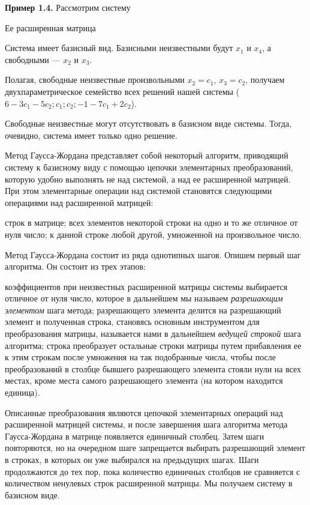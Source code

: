 \documentclass{article}
\begin{document}
\textbf{Пример 1.4.} Рассмотрим систему

Ее расширенная матрица

Система имеет базисный вид. Базисными неизвестными будут $x_1$ и $x_4$, а свободными — $x_2$ и $x_3$.

Полагая, свободные неизвестные произвольными $x_2=c_1$, $x_3=c_2$, получаем двухпараметрическое семейство всех решений нашей системы ($6-3c_1-5c_2;c_1;c_2;-1-7c_1+2c_2$).

Свободные неизвестные могут отсутствовать в базисном виде системы. Тогда, очевидно, система имеет только одно решение.

Метод Гаусса-Жордана представляет собой некоторый алгоритм, приводящий систему к базисному виду с помощью цепочки элементарных преобразований, которую удобно выполнять не над системой, а над ее расширенной матрицей. При этом элементарные операции над системой становятся следующими операциями над расширенной матрицей:
		\begin{enumerate}
			\renewcommand{\theenumi}{(\arabic{enumi})}
			\renewcommand{\labelenumi}{\arabic{enumi})}
			 строк в матрице;
			 всех элементов некоторой строки на одно и то же отличное от нуля число;
			 к данной строке любой другой, умноженной на произвольное число.
		\end{enumerate}

Метод Гаусса-Жордана состоит из ряда однотипных шагов. Опишем первый шаг алгоритма. Он состоит из трех этапов: 
		\begin{enumerate}
			\renewcommand{\theenumi}{(\arabic{enumi})}
			\renewcommand{\labelenumi}{\arabic{enumi})}
			 коэффициентов при неизвестных расширенной матрицы системы выбирается отличное от нуля число, которое в дальнейшем мы называем  \textit{разрешающим элементом} шага метода;
			 разрешающего элемента делится на разрешающий элемент и полученная строка, становясь основным инструментом для преобразования матрицы, называется нами в дальнейшем \textit{ведущей строкой} шага алгоритма;
			 строка преобразует остальные строки матрицы путем прибавления ее к этим строкам после умножения на так подобранные числа, чтобы после преобразований в столбце бывшего разрешающего элемента стояли нули на всех местах, кроме места самого разрешающего элемента (на котором находится единица).
		\end{enumerate}

Описанные преобразования являются цепочкой элементарных операций над расширенной матрицей системы, и после завершения шага алгоритма метода Гаусса-Жордана в матрице появляется единичный столбец. Затем шаги повторяются, но на очередном шаге запрещается выбирать разрешающий элемент в строках, в которых он уже выбирался на предыдущих шагах. Шаги продолжаются до тех пор, пока количество единичных столбцов не сравняется с количеством ненулевых строк расширенной матрицы. Мы получаем систему в базисном виде.
\end{document}
